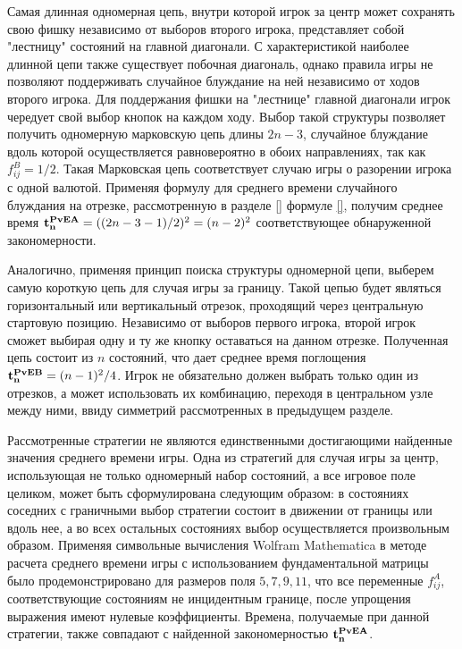Самая длинная одномерная цепь, внутри которой игрок за центр может сохранять свою фишку независимо от выборов второго игрока, 
представляет собой "лестницу" состояний на главной диагонали. С характеристикой наиболее длинной цепи также существует побочная диагональ, однако
правила игры не позволяют поддерживать случайное блуждание на ней независимо от ходов второго игрока. 
Для поддержания фишки на "лестнице" главной диагонали игрок чередует свой выбор кнопок на каждом ходу.
Выбор такой структуры позволяет получить одномерную марковскую 
цепь длины $2n-3$, случайное блуждание вдоль которой осуществляется равновероятно в обоих направлениях, так как $f_{ij}^B=1/2$.
Такая Марковская цепь соответствует случаю игры о разорении игрока с одной валютой. Применяя формулу для среднего времени случайного блуждания на отрезке,
рассмотренную в разделе \cref{} формуле \cref{}, получим среднее время ${\bf t_n^{PvE A}} = ((2n-3-1)/2)^2 = (n-2)^2$ соответствующее обнаруженной закономерности.

Аналогично, применяя принцип поиска структуры одномерной цепи, выберем самую короткую цепь для случая игры за границу.
Такой цепью будет являться горизонтальный или вертикальный отрезок, проходящий через центральную стартовую позицию.
Независимо от выборов первого игрока, второй игрок сможет выбирая одну и ту же кнопку оставаться на данном отрезке.
Полученная цепь состоит из $n$ состояний, что дает среднее время поглощения ${\bf t_n^{PvE B}} = (n-1)^2/4$.
Игрок не обязательно должен выбрать только один из отрезков, а может использовать их комбинацию, переходя в центральном узле между ними,
ввиду симметрий рассмотренных в предыдущем разделе. 

Рассмотренные стратегии не являются единственными достигающими найденные значения среднего времени игры. 
Одна из стратегий для случая игры за центр, использующая не только одномерный набор состояний, а все игровое поле целиком, 
может быть сформулирована следующим образом: в состояниях соседних с граничными выбор стратегии состоит в движении от границы или вдоль нее, 
а во всех остальных состояниях выбор осуществляется произвольным образом. Применяя символьные вычисления Wolfram Mathematica
в методе расчета среднего времени игры с использованием фундаментальной матрицы было продемонстрировано для размеров поля
$5, 7, 9, 11$, что все переменные $f_{ij}^A$, соответствующие состояниям не инцидентным границе, после упрощения выражения имеют нулевые коэффициенты.
Времена, получаемые при данной стратегии, также совпадают с найденной закономерностью ${\bf t_n^{PvE A}}$.






